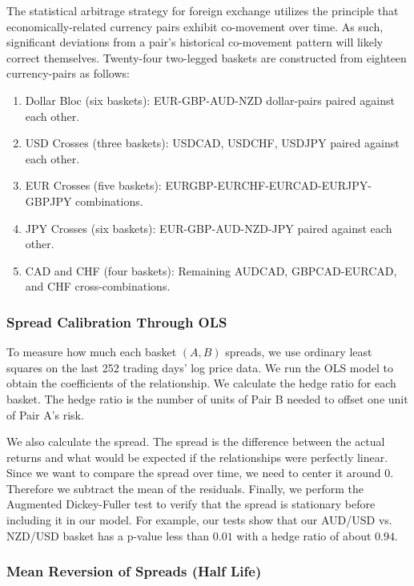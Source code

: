 \documentclass[12pt]{article}
\begin{document}
The statistical arbitrage strategy for foreign exchange utilizes the principle that economically-related currency pairs exhibit co-movement over time. As such, significant deviations from a pair's historical co-movement pattern will likely correct themselves. Twenty-four two-legged baskets are constructed from eighteen currency-pairs as follows:

\begin{enumerate}
    \item Dollar Bloc (six baskets): EUR-GBP-AUD-NZD dollar-pairs paired against each other.
    \item USD Crosses (three baskets): USDCAD, USDCHF, USDJPY paired against each other.
    \item EUR Crosses (five baskets): EURGBP-EURCHF-EURCAD-EURJPY-GBPJPY combinations.
    \item JPY Crosses (six baskets): EUR-GBP-AUD-NZD-JPY paired against each other.
    \item CAD and CHF (four baskets): Remaining AUDCAD, GBPCAD-EURCAD, and CHF cross-combinations.
\end{enumerate}

\subsubsection{Spread Calibration Through OLS}

To measure how much each basket $(A,B)$ spreads, we use ordinary least squares on the last 252 trading days' log price data. We run the OLS model to obtain the coefficients of the relationship. We calculate the hedge ratio for each basket. The hedge ratio is the number of units of Pair B needed to offset one unit of Pair A's risk.

We also calculate the spread. The spread is the difference between the actual returns and what would be expected if the relationships were perfectly linear. Since we want to compare the spread over time, we need to center it around 0. Therefore we subtract the mean of the residuals. Finally, we perform the Augmented Dickey-Fuller test to verify that the spread is stationary before including it in our model. For example, our tests show that our AUD/USD vs. NZD/USD basket has a p-value less than $0.01$ with a hedge ratio of about $0.94$.

\subsubsection{Mean Reversion of Spreads (Half Life)}
\end{document}
